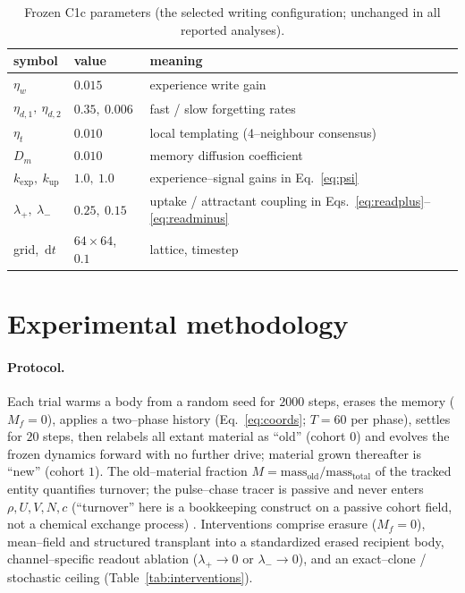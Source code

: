 \documentclass[11pt]{article}
\begin{document}
\begin{table}[t]\centering\small
\caption{Frozen C1c parameters (the selected writing configuration; unchanged in all reported analyses).}
\label{tab:params}
\begin{tabular}{@{}lll@{}}\toprule
symbol & value & meaning\\\midrule
$\eta_w$ & $0.015$ & experience write gain\\
$\eta_{d,1},\ \eta_{d,2}$ & $0.35,\ 0.006$ & fast / slow forgetting rates\\
$\eta_t$ & $0.010$ & local templating (4--neighbour consensus)\\
$D_m$ & $0.010$ & memory diffusion coefficient\\
$k_{\exp},\ k_{\mathrm{up}}$ & $1.0,\ 1.0$ & experience--signal gains in Eq.~\eqref{eq:psi}\\
$\lambda_+,\ \lambda_-$ & $0.25,\ 0.15$ & uptake / attractant coupling in Eqs.~\eqref{eq:readplus}--\eqref{eq:readminus}\\
grid,\ $\mathrm{d}t$ & $64\times64$,\ $0.1$ & lattice, timestep\\\bottomrule
\end{tabular}
\end{table}

\section{Experimental methodology}
\label{sec:methods}
\paragraph{Protocol.} Each trial warms a body from a random seed for $2000$ steps, erases the memory
($M_f=0$), applies a two--phase history (Eq.~\ref{eq:coords}; $T=60$ per phase), settles for $20$ steps, then
relabels all extant material as ``old'' (cohort $0$) and evolves the frozen dynamics forward with no further
drive; material grown thereafter is ``new'' (cohort $1$). The old--material fraction
$M=\text{mass}_{\text{old}}/\text{mass}_{\text{total}}$ of the tracked entity quantifies turnover; the pulse--chase tracer is passive and never enters $\rho,U,V,N,c$ (``turnover'' here is a bookkeeping construct on a passive cohort field, not a chemical exchange process) \citep{jaqaman2008}. Interventions comprise erasure ($M_f=0$),
mean--field and structured transplant into a standardized erased recipient body, channel--specific readout ablation
($\lambda_+\!\to\!0$ or $\lambda_-\!\to\!0$), and an exact--clone / stochastic ceiling (Table~\ref{tab:interventions}).
\end{document}
